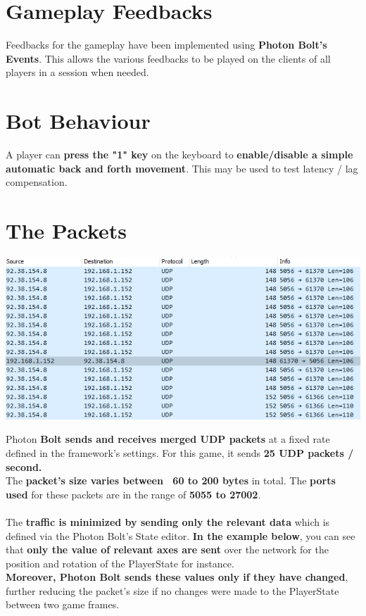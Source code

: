 \documentclass[12pt,a4paper]{article}
\begin{document}
\section{Gameplay Feedbacks}
Feedbacks for the gameplay have been implemented using \textbf{Photon Bolt's Events}. This allows the various feedbacks to be played on the clients of all players in a session when needed.

\section{Bot Behaviour}
A player can \textbf{press the "1" key} on the keyboard to \textbf{enable/disable a simple automatic back and forth movement}. This may be used to test latency / lag compensation.

\section{The Packets}
\begin{center}
\includegraphics[scale=1.0]{NetworkingPackets}
\end{center}
Photon \textbf{Bolt sends and receives merged UDP packets} at a fixed rate defined in the framework's settings. For this game, it sends \textbf{25 UDP packets / second.}\\
The \textbf{packet's size varies between ~60 to 200 bytes} in total. The \textbf{ports used} for these packets are in the range of \textbf{5055 to 27002}.\\\\
The \textbf{traffic is minimized by sending only the relevant data} which is defined via the Photon Bolt's State editor. \textbf{In the example below}, you can see that \textbf{only the value of relevant axes are sent} over the network for the position and rotation of the PlayerState for instance.\\
\textbf{Moreover, Photon Bolt sends these values only if they have changed}, further reducing the packet's size if no changes were made to the PlayerState between two game frames.
\end{document}
